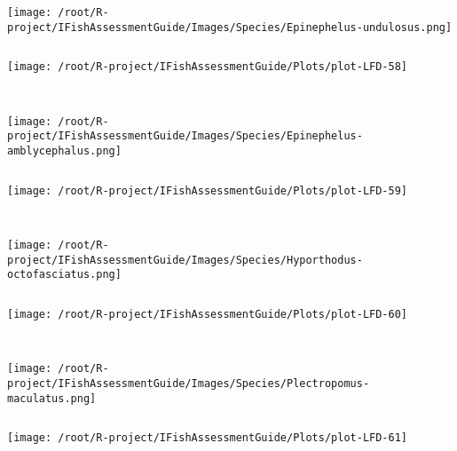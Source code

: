 \begin{knitrout}
\begin{kframe}
\begin{verbatim}
\end{verbatim}
\end{kframe}
\texttt{[image: /root/R-project/IFishAssessmentGuide/Images/Species/Epinephelus-undulosus.png]}
\begin{kframe}\begin{verbatim}
\end{verbatim}
\end{kframe}
\texttt{[image: /root/R-project/IFishAssessmentGuide/Plots/plot-LFD-58]} 
\begin{kframe}\begin{verbatim}
 
\end{verbatim}
\end{kframe}
\texttt{[image: /root/R-project/IFishAssessmentGuide/Images/Species/Epinephelus-amblycephalus.png]}
\begin{kframe}\begin{verbatim}
\end{verbatim}
\end{kframe}
\texttt{[image: /root/R-project/IFishAssessmentGuide/Plots/plot-LFD-59]} 
\begin{kframe}\begin{verbatim}
 
\end{verbatim}
\end{kframe}
\texttt{[image: /root/R-project/IFishAssessmentGuide/Images/Species/Hyporthodus-octofasciatus.png]}
\begin{kframe}\begin{verbatim}
\end{verbatim}
\end{kframe}
\texttt{[image: /root/R-project/IFishAssessmentGuide/Plots/plot-LFD-60]} 
\begin{kframe}\begin{verbatim}
 
\end{verbatim}
\end{kframe}
\texttt{[image: /root/R-project/IFishAssessmentGuide/Images/Species/Plectropomus-maculatus.png]}
\begin{kframe}\begin{verbatim}
\end{verbatim}
\end{kframe}
\texttt{[image: /root/R-project/IFishAssessmentGuide/Plots/plot-LFD-61]} 
\begin{kframe}\begin{verbatim}
 

\end{verbatim}
\end{kframe}
\end{knitrout}
